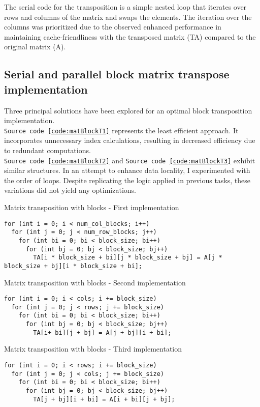 \documentclass{article}
\begin{document}
The serial code for the transposition is a simple nested loop that iterates over rows and columns of the matrix and swaps the elements.
The iteration over the columns was prioritized due to the observed enhanced performance in maintaining cache-friendliness with the transposed matrix (TA) compared to the original matrix (A).

\subsection*{Serial and parallel block matrix transpose implementation}

Three principal solutions have been explored for an optimal block transposition implementation.\\
\texttt{Source code~\ref{code:matBlockT1}} represents the least efficient approach. It incorporates unnecessary index calculations, resulting in decreased efficiency due to redundant computations.\\
\texttt{Source code~\ref{code:matBlockT2}} and \texttt{Source code~\ref{code:matBlockT3}} exhibit similar structures. In an attempt to enhance data locality, I experimented with the order of loops. Despite replicating the logic applied in previous tasks, these variations did not yield any optimizations.

\begin{code}
    \caption{\label{code:matBlockT1}Matrix transposition with blocks - First implementation}
    \begin{verbatim}
for (int i = 0; i < num_col_blocks; i++)
  for (int j = 0; j < num_row_blocks; j++)
    for (int bi = 0; bi < block_size; bi++)
      for (int bj = 0; bj < block_size; bj++)
        TA[i * block_size + bi][j * block_size + bj] = A[j * block_size + bj][i * block_size + bi];    
    \end{verbatim}
\end{code}

\begin{multicols}{2}
    \begin{code}
        \caption{\label{code:matBlockT2}Matrix transposition with blocks - Second implementation}
        \begin{verbatim}
for (int i = 0; i < cols; i += block_size) 
  for (int j = 0; j < rows; j += block_size) 
    for (int bi = 0; bi < block_size; bi++) 
      for (int bj = 0; bj < block_size; bj++) 
        TA[i+ bi][j + bj] = A[j + bj][i + bi];
        \end{verbatim}
    \end{code}
    
    \columnbreak

    \begin{code}
        \caption{\label{code:matBlockT3}Matrix transposition with blocks - Third implementation}
        \begin{verbatim}
for (int i = 0; i < rows; i += block_size) 
  for (int j = 0; j < cols; j += block_size) 
    for (int bi = 0; bi < block_size; bi++)
      for (int bj = 0; bj < block_size; bj++) 
        TA[j + bj][i + bi] = A[i + bi][j + bj];
        \end{verbatim}
    \end{code}
\end{multicols}
\end{document}
